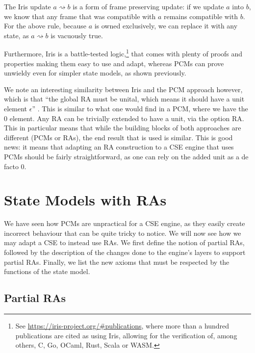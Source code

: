 The Iris update $a \rightsquigarrow b$ is a form of frame preserving update: if we update $a$ into $b$, we know that any frame that was compatible with $a$ remains compatible with $b$. For the above rule, because $a$ is owned exclusively, we can replace it with any state, as $a\rightsquigarrow b$ is vacuously true.

Furthermore, Iris is a battle-tested logic,\footnote{See \url{https://iris-project.org/\#publications}, where more than a hundred publications are cited as using Iris, allowing for the verification of, among others, C, Go, OCaml, Rust, Scala or WASM.} that comes with plenty of proofs and properties making them easy to use and adapt, whereas PCMs can prove unwieldy even for simpler state models, as shown previously.

We note an interesting similarity between Iris and the PCM approach however, which is that ``the global RA must be unital, which means it should have a unit element $\epsilon$'' \cite{iris}. This is similar to what one would find in a PCM, where we have the $0$ element. Any RA can be trivially extended to have a unit, via the option RA. This in particular means that while the building blocks of both approaches are different (PCMs or RAs), the end result that is used is similar. This is good news: it means that adapting an RA construction to a CSE engine that uses PCMs should be fairly straightforward, as one can rely on the added unit as a de facto $0$.

\section{State Models with RAs} \label{sec:theory-state-model-ras}

We have seen how PCMs are unpractical for a CSE engine, as they easily create incorrect behaviour that can be quite tricky to notice. We will now see how we may adapt a CSE to instead use RAs. We first define the notion of partial RAs, followed by the description of the changes done to the engine's layers to support partial RAs. Finally, we list the new axioms that must be respected by the functions of the state model.

\subsection{Partial RAs}

